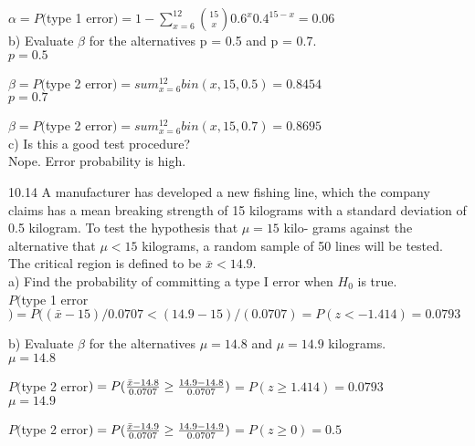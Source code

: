 $\alpha = P($type 1 error$)=1 - \sum^{12}_{x=6} $${15} \choose {x}$$0.6^x0.4^{15-x}$$= 0.06$ \\

b) Evaluate $\beta$ for the alternatives p = 0.5 and p = 0.7. \\

$p = 0.5$ 

$\beta = P($type 2 error$) = sum^{12}_{x=6} bin(x,15,0.5) = 0.8454$ \\

$p = 0.7$ 

$\beta = P($type 2 error$) = sum^{12}_{x=6} bin(x,15,0.7) = 0.8695$ \\

c) Is this a good test procedure? \\

Nope. Error probability is high.

10.14 A manufacturer has developed a new fishing
line, which the company claims has a mean breaking
strength of 15 kilograms with a standard deviation of
0.5 kilogram. To test the hypothesis that $\mu = 15$ kilo-
grams against the alternative that $\mu < 15$ kilograms, a
random sample of 50 lines will be tested. The critical
region is defined to be $\bar{x} < 14.9$. \\

a) Find the probability of committing a type I error
when $H_0$ is true.  \\

$P($type 1 error$) = P((\bar{x} - 15)/0.0707 < (14.9-15)/(0.0707) = P(z < -1.414) = 0.0793$

b) Evaluate $\beta$ for the alternatives $\mu = 14.8$ and $\mu  = 14.9$ kilograms. \\

$\mu = 14.8$

$P($type 2 error$) = P(\frac{\bar{x} - 14.8}{0.0707} \geq \frac{14.9 - 14.8}{0.0707}) $$=P(z \geq 1.414) = 0.0793$ \\

$\mu = 14.9$

$P($type 2 error$) = P(\frac{\bar{x} - 14.9}{0.0707} \geq \frac{14.9 - 14.9}{0.0707}) $$=P(z \geq 0) = 0.5$



